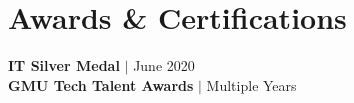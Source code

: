 \documentclass[letterpaper,11pt]{article}
\begin{document}
\section{Awards \& Certifications}
 \begin{itemize}[leftmargin=0.15in, label={}]
    \small{\item{
     {\textbf{IT Silver Medal} $|$ {June 2020}} \\ 
     {\textbf{GMU Tech Talent Awards} $|$ {Multiple Years}}
    }}
 \end{itemize}


\end{document}
